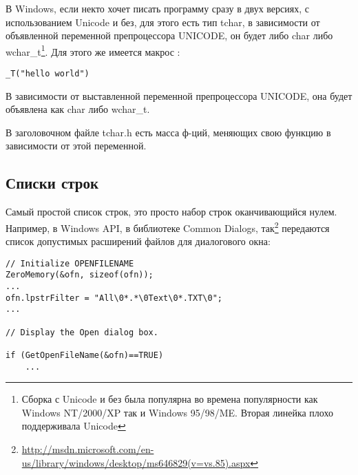 В Windows, если некто хочет писать программу сразу в двух версиях, с использованием Unicode и без,
для этого есть тип tchar, в зависимости от объявленной переменной препроцессора UNICODE, 
он будет либо char либо wchar\_t\footnote{Сборка с Unicode и без была популярна во времена популярности
как Windows NT/2000/XP так и Windows 95/98/ME. Вторая линейка плохо поддерживала Unicode}.
Для этого же имеется макрос :

\begin{lstlisting}
_T("hello world")
\end{lstlisting}

В зависимости от выставленной переменной препроцессора UNICODE, она будет объявлена как char либо wchar\_t.

В заголовочном файле tchar.h есть масса ф-ций, меняющих свою функцию в зависимости от этой переменной.

\subsection{Списки строк}

Самый простой список строк, это просто набор строк оканчивающийся нулем.
Например, в Windows API, в библиотеке Common Dialogs, 
так\footnote{\url{http://msdn.microsoft.com/en-us/library/windows/desktop/ms646829(v=vs.85).aspx}} 
передаются список допустимых расширений файлов для диалогового окна:

\begin{lstlisting}
// Initialize OPENFILENAME
ZeroMemory(&ofn, sizeof(ofn));
...
ofn.lpstrFilter = "All\0*.*\0Text\0*.TXT\0";
...

// Display the Open dialog box. 

if (GetOpenFileName(&ofn)==TRUE) 
	...
\end{lstlisting}

